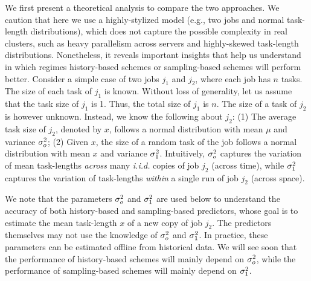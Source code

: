 We first  present a theoretical analysis to compare the two
approaches. We caution that here we use a highly-stylized model (e.g., two
jobs and normal task-length distributions), which does not capture the
possible complexity in real clusters, such as heavy parallelism across servers and highly-skewed 
task-length distributions. Nonetheless, it reveals important insights
that help us understand in which regimes history-based schemes or sampling-based
schemes will perform better. Consider a simple case of two jobs
$j_1$ and $j_2$, where each job has $n$ tasks. The size of each task of $j_1$
is known. Without loss of generality, let us assume that the task size of $j_1$
is 1. Thus, the total size of $j_1$ is $n$. The size of a task of $j_2$ is
however unknown. Instead, we know the following about $j_2$: 
(1) The average
task size of $j_2$, denoted by $x$, follows a normal
distribution with mean $\mu$ and variance $\sigma_o^2$;
(2) Given $x$, the size of a random task of the job follows a normal 
distribution with mean $x$ and variance $\sigma_1^2$.
Intuitively, $\sigma_o^2$ captures the variation of mean
task-lengths \emph{across} many \emph{i.i.d.} copies of job $j_2$ (\ie across time), while
$\sigma_1^2$ captures the variation of task-lengths \emph{within} a
single run of job $j_2$ (\ie across space).

We note that the parameters $\sigma_o^2$ and
$\sigma_1^2$ are used below to understand the accuracy of both
history-based and sampling-based predictors, whose goal is to estimate
the mean task-length $x$ of a new copy of job $j_2$. The predictors
themselves may not use the knowledge of $\sigma_o^2$ and
$\sigma_1^2$. In practice,
these parameters can be estimated offline from historical data. 
We will see soon that the performance of history-based schemes
will mainly depend on $\sigma_o^2$, while the performance of sampling-based
schemes will mainly depend on $\sigma_1^2$.


